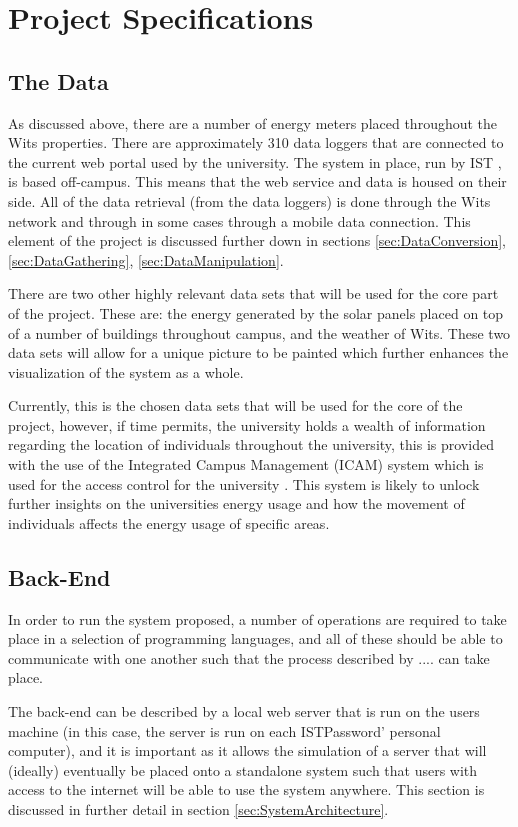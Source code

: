 \documentclass[12pt,onecolumn]{IEEEtran}
\begin{document}
\section{Project Specifications}

\subsection{The Data} \label{sec:TheData}
As discussed above, there are a number of energy meters placed throughout the Wits properties. There are approximately 310 data loggers that are connected to the current web portal used by the university. 
The system in place, run by IST \cite{IST}, is based off-campus. This means that the web service and data is housed on their side. All of the data retrieval (from the data loggers) is done through the Wits network and through in some cases through a mobile data connection. This element of the project is discussed further down in sections \ref{sec:DataConversion}, \ref{sec:DataGathering}, \ref{sec:DataManipulation}. 

There are two other highly relevant data sets that will be used for the core part of the project. These are: the energy generated by the solar panels placed on top of a number of buildings throughout campus, and the weather of Wits. 
These two data sets will allow for a unique picture to be painted which further enhances the visualization of the system as a whole. 

Currently, this is the chosen data sets that will be used for the core of the project, however, if time permits, the university holds a wealth of information regarding the location of individuals throughout the university, this is provided with the use of the Integrated Campus Management (ICAM) system which is used for the access control for the university \cite{icam}. 
This system is likely to unlock further insights on the universities energy usage and how the movement of individuals affects the energy usage of specific areas. 


\subsection{Back-End} \label{sec:BackEnd}
In order to run the system proposed, a number of operations are required to take place in a selection of programming languages, and all of these should be able to communicate with one another such that the process described by .... can take place. 

The back-end can be described by a local web server that is run on the users machine (in this case, the server is run on each ISTPassword' personal computer), and it is important as it allows the simulation of a server that will (ideally) eventually be placed onto a standalone system such that users with access to the internet will be able to use the system anywhere.
This section is discussed in further detail in section \ref{sec:SystemArchitecture}.
\end{document}
